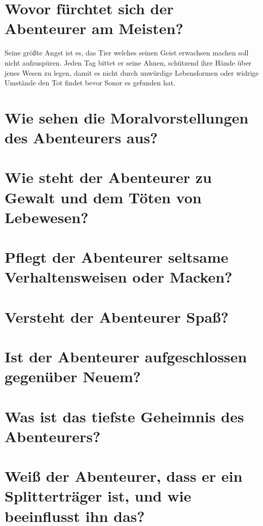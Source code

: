 \documentclass{article}
\begin{document}
	
	\section[Ängste]{Wovor fürchtet sich der Abenteurer am Meisten?}

	Seine größte Angst ist es, das Tier welches seinen Geist erwachsen
	machen soll nicht aufzuspüren. Jeden Tag bittet er seine Ahnen,
	schützend ihre Hände über jenes Wesen zu legen, damit es nicht durch
	unwürdige Lebensformen oder widrige Umstände den Tot findet bevor Sonor
	es gefunden hat.

	\section[Moral]{Wie sehen die Moralvorstellungen des Abenteurers aus?}
	
	\section[Frustrationstoleranz]{Wie steht der Abenteurer zu Gewalt und dem Töten von Lebewesen?}

	\section[Macken]{Pflegt der Abenteurer seltsame Verhaltensweisen oder Macken?}
	
	\section[Humor]{Versteht der Abenteurer Spaß?}
	
	\section[Aufgeschlossenheit]{Ist der Abenteurer aufgeschlossen gegenüber Neuem?}
	
	\section[Top Secret]{Was ist das tiefste Geheimnis des Abenteurers?}
	
	\section[Splitter]{Weiß der Abenteurer, dass er ein Splitterträger ist, und wie beeinflusst ihn das?}
\end{document}
